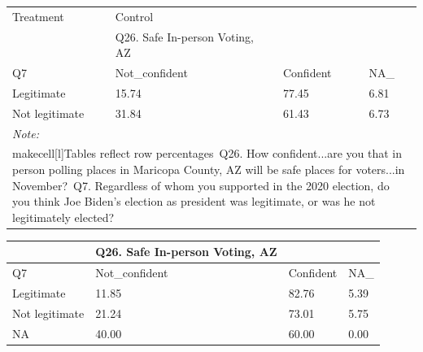 \documentclass[
  11pt,
  a4paper,
]{article}
\begin{document}
\begin{table}
\centering
\centering
\begin{tabular}[t]{l|l|l|l}
\hline
\multicolumn{1}{l|}{Treatment} & \multicolumn{1}{l}{Control} \\
\cline{1-1} \cline{2-2}
 & Q26. Safe In-person Voting, AZ &  & \\
\hline
Q7 & Not\_confident & Confident & NA\_\\
\hline
Legitimate & 15.74 & 77.45 & 6.81\\
\hline
Not legitimate & 31.84 & 61.43 & 6.73\\
\hline
\multicolumn{4}{l}{\rule{0pt}{1em}\textit{Note: }}\\
\multicolumn{4}{l}{\rule{0pt}{1em}makecell[l]{Tables reflect row percentages\ Q26. How confident...are you that in person polling places in Maricopa County, AZ will be safe places for voters...in November?\ Q7. Regardless of whom you supported in the 2020 election, do you think Joe Biden's election as president was legitimate, or was he not legitimately elected?}}\\
\end{tabular}
\centering
\begin{tabular}[t]{l|l|l|l}
\hline
 & Q26. Safe In-person Voting, AZ &  & \\
\hline
Q7 & Not\_confident & Confident & NA\_\\
\hline
Legitimate & 11.85 & 82.76 & 5.39\\
\hline
Not legitimate & 21.24 & 73.01 & 5.75\\
\hline
NA & 40.00 & 60.00 & 0.00\\
\hline
\end{tabular}
\end{table}
\end{document}

